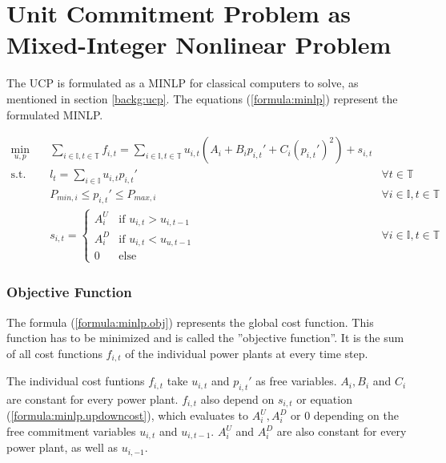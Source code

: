 \section{Unit Commitment Problem as Mixed-Integer Nonlinear Problem}

The UCP is formulated as a MINLP for classical computers to solve,
as mentioned in section \ref{backg:ucp}.
The equations (\ref{formula:minlp}) represent the formulated MINLP.

\begin{subequations}
\begin{align}
  \min_{u, p} \quad &
  \sum_{i \in \mathbb{I}, t \in \mathbb{T}} f_{i, t}
  = \sum_{i \in \mathbb{I}, t \in \mathbb{T}}
    u_{i, t} (A_i + B_i p_{i, t}' + C_i (p_{i, t}')^2) + s_{i, t}
  \label{formula:minlp.obj} \\
  \text{s.t.} \quad & l_t = \sum_{i \in \mathbb{I}} u_{i, t} p_{i, t}' \quad &
  \forall t \in \mathbb{T}
  \label{formula:minlp.load} \\
  &
  P_{min, i} \leq p_{i, t}' \leq P_{max, i} \quad &
  \forall i \in \mathbb{I}, t \in \mathbb{T}
  \label{formula:minlp.power} \\
  &
  s_{i, t} = \begin{cases}
    A_i^U & \text{if } u_{i, t} > u_{i, t-1} \\
    A_i^D & \text{if } u_{i, t} < u_{u, t-1} \\
    0 & \text{else}
  \end{cases} \quad &
  \forall i \in \mathbb{I}, t \in \mathbb{T}
  \label{formula:minlp.updowncost}
\end{align}
\label{formula:minlp}
\end{subequations}

\subsubsection{Objective Function}

The formula (\ref{formula:minlp.obj}) represents the global cost function.
This function has to be minimized and is called the ''objective function''.
It is the sum of all cost functions $f_{i, t}$ of the individual power plants at every time step.

The individual cost funtions $f_{i, t}$ take $u_{i, t}$ and $p_{i, t}'$ as free variables.
$A_i, B_i$ and $C_i$ are constant for every power plant.
$f_{i, t}$ also depend on $s_{i, t}$ or equation (\ref{formula:minlp.updowncost}),
which evaluates to $A_i^U, A_i^D$ or $0$ depending on the free commitment variables $u_{i, t}$ and $u_{i, t-1}$.
$A_i^U$ and $A_i^D$ are also constant for every power plant,
as well as $u_{i, -1}$.

